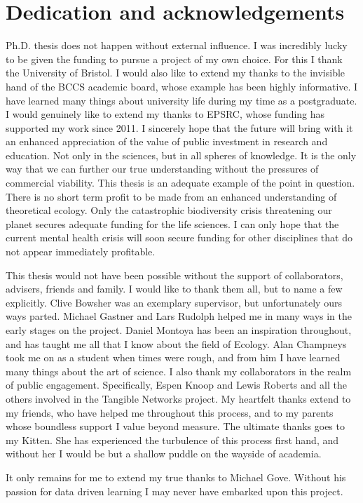 %
%

\chapter*{Dedication and acknowledgements}
\begin{SingleSpace}
 Ph.D. thesis does not happen without external influence. I was incredibly lucky to be given the funding to pursue a project of my own choice. For this I thank the University of Bristol. I would also like to extend my thanks to the invisible hand of the BCCS academic board, whose example has been highly informative. I have learned many things about university life during my time as a postgraduate. I would genuinely like to extend my thanks to EPSRC, whose funding has supported my work since 2011. I sincerely hope that the future will bring with it an enhanced appreciation of the value of public investment in research and education. Not only in the sciences, but in all spheres of knowledge. It is the only way that we can further our true understanding without the pressures of commercial viability. This thesis is an adequate example of the point in question. There is no short term profit to be made from an enhanced understanding of theoretical ecology. Only the catastrophic biodiversity crisis threatening our planet secures adequate funding for the life sciences. I can only hope that the current mental health crisis will soon secure funding for other disciplines that do not appear immediately profitable.       

This thesis would not have been possible without the support of collaborators, advisers, friends and family. I would like to thank them all, but to name a few explicitly. Clive Bowsher was an exemplary supervisor, but unfortunately ours ways parted. Michael Gastner and Lars Rudolph helped me in many ways in the early stages on the project. Daniel Montoya has been an inspiration throughout, and has taught me all that I know about the field of Ecology. Alan Champneys took me on as a student when times were rough, and from him I have learned many things about the art of science. I also thank my collaborators in the realm of public engagement. Specifically, Espen Knoop and Lewis Roberts and all the others involved in the Tangible Networks project. My heartfelt thanks extend to my friends, who have helped me throughout this process, and to my parents whose boundless support I value beyond measure. The ultimate thanks goes to my Kitten. She has experienced the turbulence of this process first hand, and without her I would be but a shallow puddle on the wayside of academia. 

It only remains for me to extend my true thanks to Michael Gove. Without his passion for data driven learning I may never have embarked upon this project.  
\end{SingleSpace}
\clearpage